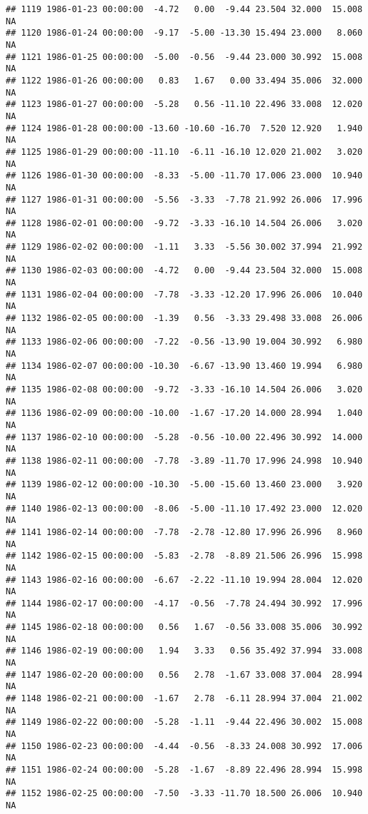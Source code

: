 \documentclass{article}\usepackage{graphicx, color}
\makeatletter
\newenvironment{kframe}{%
 \def\at@end@of@kframe{}%
 \ifinner\ifhmode%
  \def\at@end@of@kframe{\end{minipage}}%
  \begin{minipage}{\columnwidth}%
 \fi\fi%
 \def\FrameCommand##1{\hskip\@totalleftmargin \hskip-\fboxsep
 \colorbox{shadecolor}{##1}\hskip-\fboxsep
     \hskip-\linewidth \hskip-\@totalleftmargin \hskip\columnwidth}%
 \MakeFramed {\advance\hsize-\width
   \@totalleftmargin\z@ \linewidth\hsize
   \@setminipage}}%
 {\par\unskip\endMakeFramed%
 \at@end@of@kframe}
\newenvironment{knitrout}{}{} %
\makeatother
\begin{document}
\begin{knitrout}
\begin{kframe}
\begin{verbatim}
## 1119 1986-01-23 00:00:00  -4.72   0.00  -9.44 23.504 32.000  15.008     NA
## 1120 1986-01-24 00:00:00  -9.17  -5.00 -13.30 15.494 23.000   8.060     NA
## 1121 1986-01-25 00:00:00  -5.00  -0.56  -9.44 23.000 30.992  15.008     NA
## 1122 1986-01-26 00:00:00   0.83   1.67   0.00 33.494 35.006  32.000     NA
## 1123 1986-01-27 00:00:00  -5.28   0.56 -11.10 22.496 33.008  12.020     NA
## 1124 1986-01-28 00:00:00 -13.60 -10.60 -16.70  7.520 12.920   1.940     NA
## 1125 1986-01-29 00:00:00 -11.10  -6.11 -16.10 12.020 21.002   3.020     NA
## 1126 1986-01-30 00:00:00  -8.33  -5.00 -11.70 17.006 23.000  10.940     NA
## 1127 1986-01-31 00:00:00  -5.56  -3.33  -7.78 21.992 26.006  17.996     NA
## 1128 1986-02-01 00:00:00  -9.72  -3.33 -16.10 14.504 26.006   3.020     NA
## 1129 1986-02-02 00:00:00  -1.11   3.33  -5.56 30.002 37.994  21.992     NA
## 1130 1986-02-03 00:00:00  -4.72   0.00  -9.44 23.504 32.000  15.008     NA
## 1131 1986-02-04 00:00:00  -7.78  -3.33 -12.20 17.996 26.006  10.040     NA
## 1132 1986-02-05 00:00:00  -1.39   0.56  -3.33 29.498 33.008  26.006     NA
## 1133 1986-02-06 00:00:00  -7.22  -0.56 -13.90 19.004 30.992   6.980     NA
## 1134 1986-02-07 00:00:00 -10.30  -6.67 -13.90 13.460 19.994   6.980     NA
## 1135 1986-02-08 00:00:00  -9.72  -3.33 -16.10 14.504 26.006   3.020     NA
## 1136 1986-02-09 00:00:00 -10.00  -1.67 -17.20 14.000 28.994   1.040     NA
## 1137 1986-02-10 00:00:00  -5.28  -0.56 -10.00 22.496 30.992  14.000     NA
## 1138 1986-02-11 00:00:00  -7.78  -3.89 -11.70 17.996 24.998  10.940     NA
## 1139 1986-02-12 00:00:00 -10.30  -5.00 -15.60 13.460 23.000   3.920     NA
## 1140 1986-02-13 00:00:00  -8.06  -5.00 -11.10 17.492 23.000  12.020     NA
## 1141 1986-02-14 00:00:00  -7.78  -2.78 -12.80 17.996 26.996   8.960     NA
## 1142 1986-02-15 00:00:00  -5.83  -2.78  -8.89 21.506 26.996  15.998     NA
## 1143 1986-02-16 00:00:00  -6.67  -2.22 -11.10 19.994 28.004  12.020     NA
## 1144 1986-02-17 00:00:00  -4.17  -0.56  -7.78 24.494 30.992  17.996     NA
## 1145 1986-02-18 00:00:00   0.56   1.67  -0.56 33.008 35.006  30.992     NA
## 1146 1986-02-19 00:00:00   1.94   3.33   0.56 35.492 37.994  33.008     NA
## 1147 1986-02-20 00:00:00   0.56   2.78  -1.67 33.008 37.004  28.994     NA
## 1148 1986-02-21 00:00:00  -1.67   2.78  -6.11 28.994 37.004  21.002     NA
## 1149 1986-02-22 00:00:00  -5.28  -1.11  -9.44 22.496 30.002  15.008     NA
## 1150 1986-02-23 00:00:00  -4.44  -0.56  -8.33 24.008 30.992  17.006     NA
## 1151 1986-02-24 00:00:00  -5.28  -1.67  -8.89 22.496 28.994  15.998     NA
## 1152 1986-02-25 00:00:00  -7.50  -3.33 -11.70 18.500 26.006  10.940     NA

\end{verbatim}
\end{kframe}
\end{knitrout}
\end{document}
